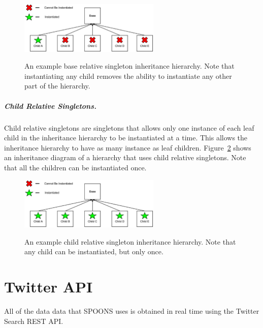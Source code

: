 \documentclass[12pt]{ucthesis}
\newcommand{\captionfonts}{\small\bf\ssp}
\begin{document}
\begin{figure}[H]
   \begin{center}
      \includegraphics[width=0.6\textwidth]{images/Base_Singleton.eps}
      \captionfonts
      \caption[Base Relative Singleton]{An example base relative singleton inheritance hierarchy. Note that instantiating any child removes the ability to instantiate any other part of the hierarchy.}
      \label{fig:baseSingleton}
   \end{center}
\end{figure}

\paragraph{Child Relative Singletons.}
Child relative singletons are singletons that allows only one instance of each leaf child in the inheritance hierarchy to be instantiated
at a time. This allows the inheritance hierarchy to have as many instance as leaf children.
Figure~\ref{fig:childSingleton} shows an inheritance diagram of a hierarchy that uses child relative singletons.
Note that all the children can be instantiated once.

\begin{figure}[H]
   \begin{center}
      \includegraphics[width=0.6\textwidth]{images/Child_Singleton.eps}
      \captionfonts
      \caption[Child Relative Singleton]{An example child relative singleton inheritance hierarchy. Note that any child can be instantiated, but only once.}
      \label{fig:childSingleton}
   \end{center}
\end{figure}

\chapter{Twitter API}
\label{api}
All of the data data that SPOONS uses is obtained in real time using the Twitter Search REST API\cite{TwitterAPI}.
\end{document}
